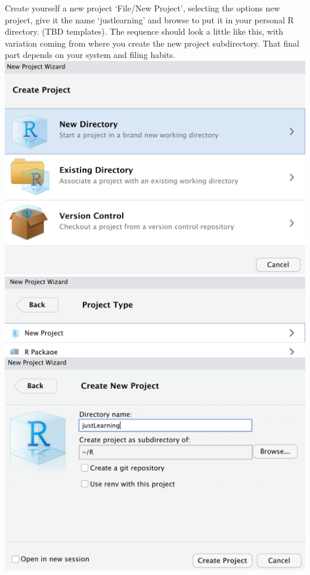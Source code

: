 \documentclass[
]{book}
\begin{document}
Create yourself a new project `File/New Project', selecting the options new project, give it the name `justlearning' and browse to put it in your personal R directory. (TBD templates). The sequence should look a little like this, with variation coming from where you create the new project subdirectory. That final part depends on your system and filing habits.
\includegraphics{images/new project 1.png}
\includegraphics{images/new project 2.png}
\includegraphics{images/new project 3.png}
\end{document}
